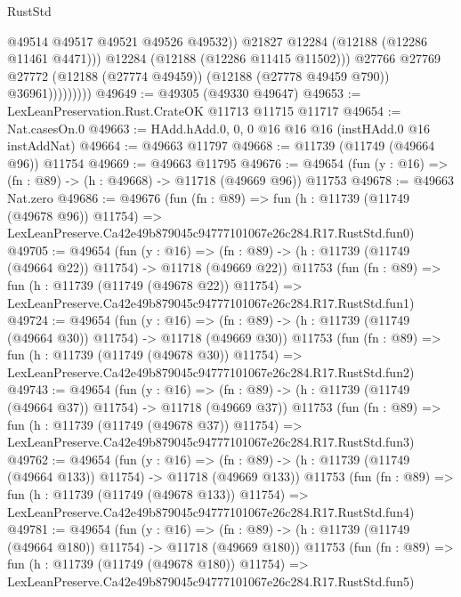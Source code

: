 \begin{lexlean}{RustStd}
\begin{coremodule}
                              @49514
                              @49517
                              @49521
                              @49526
                              @49532))
                          @21827
                          @12284
                          (@12188 (@12286 @11461 @4471)))
                        @12284
                        (@12188 (@12286 @11415 @11502)))
                      @27766
                      @27769
                      @27772
                      (@12188 (@27774 @49459))
                      (@12188 (@27778 @49459 @790))
                      @36961)))))))))
@49649 := @49305 (@49330 @49647)
@49653 := LexLeanPreservation.Rust.CrateOK @11713 @11715 @11717
@49654 := Nat.casesOn.{0}
@49663 := HAdd.hAdd.{0, 0, 0} @16 @16 @16 (instHAdd.{0} @16 instAddNat)
@49664 := @49663 @11797
@49668 := @11739 (@11749 (@49664 @96)) @11754
@49669 := @49663 @11795
@49676 := @49654 (fun (y : @16) => (fn : @89) -> (h : @49668) -> @11718 (@49669 @96)) @11753
@49678 := @49663 Nat.zero
@49686 := @49676
    (fun (fn : @89) =>
    fun (h : @11739 (@11749 (@49678 @96)) @11754) =>
    LexLeanPreserve.Ca42e49b879045c94777101067e26c284.R17.RustStd.fun0)
@49705 := @49654
    (fun (y : @16) =>
    (fn : @89) -> (h : @11739 (@11749 (@49664 @22)) @11754) -> @11718 (@49669 @22))
    @11753
    (fun (fn : @89) =>
    fun (h : @11739 (@11749 (@49678 @22)) @11754) =>
    LexLeanPreserve.Ca42e49b879045c94777101067e26c284.R17.RustStd.fun1)
@49724 := @49654
    (fun (y : @16) =>
    (fn : @89) -> (h : @11739 (@11749 (@49664 @30)) @11754) -> @11718 (@49669 @30))
    @11753
    (fun (fn : @89) =>
    fun (h : @11739 (@11749 (@49678 @30)) @11754) =>
    LexLeanPreserve.Ca42e49b879045c94777101067e26c284.R17.RustStd.fun2)
@49743 := @49654
    (fun (y : @16) =>
    (fn : @89) -> (h : @11739 (@11749 (@49664 @37)) @11754) -> @11718 (@49669 @37))
    @11753
    (fun (fn : @89) =>
    fun (h : @11739 (@11749 (@49678 @37)) @11754) =>
    LexLeanPreserve.Ca42e49b879045c94777101067e26c284.R17.RustStd.fun3)
@49762 := @49654
    (fun (y : @16) =>
    (fn : @89) -> (h : @11739 (@11749 (@49664 @133)) @11754) -> @11718 (@49669 @133))
    @11753
    (fun (fn : @89) =>
    fun (h : @11739 (@11749 (@49678 @133)) @11754) =>
    LexLeanPreserve.Ca42e49b879045c94777101067e26c284.R17.RustStd.fun4)
@49781 := @49654
    (fun (y : @16) =>
    (fn : @89) -> (h : @11739 (@11749 (@49664 @180)) @11754) -> @11718 (@49669 @180))
    @11753
    (fun (fn : @89) =>
    fun (h : @11739 (@11749 (@49678 @180)) @11754) =>
    LexLeanPreserve.Ca42e49b879045c94777101067e26c284.R17.RustStd.fun5)

\end{coremodule}
\end{lexlean}
